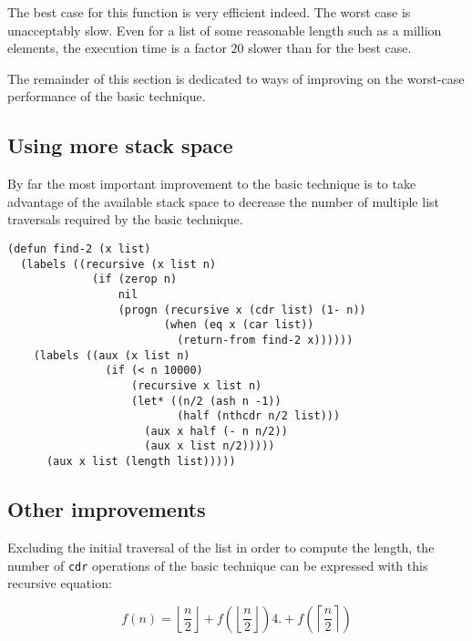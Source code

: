 The best case for this function is very efficient indeed.%
The worst case is unacceptably slow.  Even for a list of some
reasonable length such as a million elements, the execution time is a
factor $20$ slower than for the best case.

The remainder of this section is dedicated to ways of improving on the
worst-case performance of the basic technique.

\subsection{Using more stack space}

By far the most important improvement to the basic technique is to
take advantage of the available stack space to decrease the number of
multiple list traversals required by the basic technique.

{\small\begin{verbatim}
(defun find-2 (x list)
  (labels ((recursive (x list n)
             (if (zerop n)
                 nil
                 (progn (recursive x (cdr list) (1- n))
                        (when (eq x (car list))
                          (return-from find-2 x))))))
    (labels ((aux (x list n)
               (if (< n 10000)
                   (recursive x list n)
                   (let* ((n/2 (ash n -1))
                          (half (nthcdr n/2 list)))
                     (aux x half (- n n/2))
                     (aux x list n/2)))))
      (aux x list (length list)))))
\end{verbatim}}

\subsection{Other improvements}

Excluding the initial traversal of the list in order to compute the
length, the number of \texttt{cdr} operations of the basic technique
can be expressed with this recursive equation:%

$$f(n) = \left\lfloor\frac{n}{2}\right\rfloor
+ f(\left\lfloor\frac{n}{2}\right\rfloor)4.
+ f(\left\lceil\frac{n}{2}\right\rceil)$$
